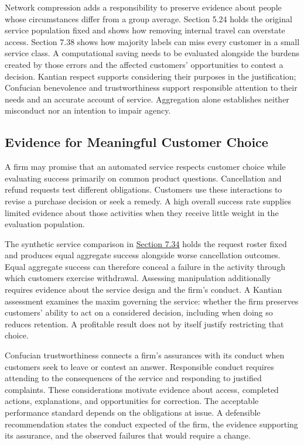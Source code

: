 Network compression adds a responsibility to preserve evidence about
people whose circumstances differ from a group average. Section 5.24
holds the original service population fixed and shows how removing
internal travel can overstate access. Section 7.38 shows how majority
labels can miss every customer in a small service class. A computational
saving needs to be evaluated alongside the burdens created by those
errors and the affected customers' opportunities to contest a decision.
Kantian respect supports considering their purposes in the
justification; Confucian benevolence and trustworthiness support
responsible attention to their needs and an accurate account of service.
Aggregation alone establishes neither misconduct nor an intention to
impair agency.

\hypertarget{M09-evidence-for-meaningful-customer-choice}{%
\subsection{Evidence for Meaningful Customer
Choice}\label{M09-evidence-for-meaningful-customer-choice}}

\noindent \noindent A firm may promise that an automated service respects customer
choice while evaluating success primarily on common product questions.
Cancellation and refund requests test different obligations. Customers
use these interactions to revise a purchase decision or seek a remedy. A
high overall success rate supplies limited evidence about those
activities when they receive little weight in the evaluation population.

The synthetic service comparison in
\href{M07_Prediction_and_Machine_Learning.md}{Section 7.34} holds the
request roster fixed and produces equal aggregate success alongside
worse cancellation outcomes. Equal aggregate success can therefore
conceal a failure in the activity through which customers exercise
withdrawal. Assessing manipulation additionally requires evidence about
the service design and the firm's conduct. A Kantian assessment examines
the maxim governing the service: whether the firm preserves customers'
ability to act on a considered decision, including when doing so reduces
retention. A profitable result does not by itself justify restricting
that choice.

Confucian trustworthiness connects a firm's assurances with its conduct
when customers seek to leave or contest an answer. Responsible conduct
requires attending to the consequences of the service and responding to
justified complaints. These considerations motivate evidence about
access, completed actions, explanations, and opportunities for
correction. The acceptable performance standard depends on the
obligations at issue. A defensible recommendation states the conduct
expected of the firm, the evidence supporting its assurance, and the
observed failures that would require a change.


